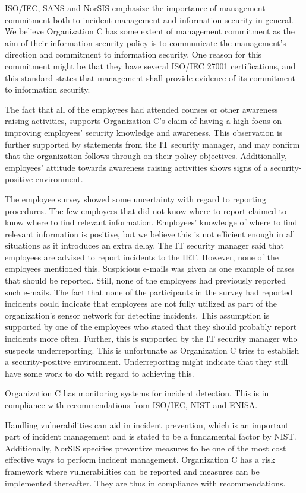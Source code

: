 ISO/IEC, SANS and NorSIS emphasize the importance of management commitment both to incident management and information security in general. We believe Organization C has some extent of management commitment as the aim of their information security policy is to communicate the management's direction and commitment to information security. One reason for this commitment might be that they have several ISO/IEC 27001 certifications, and this standard states that management shall provide evidence of its commitment to information security. 

The fact that all of the employees had attended courses or other awareness raising activities, supports Organization C's claim of having a high focus on improving employees' security knowledge and awareness. This observation is further supported by statements from the IT security manager, and may confirm that the organization follows through on their policy objectives. Additionally, employees' attitude towards awareness raising activities shows signs of a security-positive environment.  
 
The employee survey showed some uncertainty with regard to reporting procedures. The few employees that did not know where to report claimed to know where to find relevant information. Employees' knowledge of where to find relevant information is positive, but we believe this is not efficient enough in all situations as it introduces an extra delay. The IT security manager said that employees are advised to report incidents to the \ac{IRT}. However, none of the employees mentioned this. Suspicious e-mails was given as one example of cases that should be reported. Still, none of the employees had previously reported such e-mails. The fact that none of the participants in the survey had reported incidents could indicate that employees are not fully utilized as part of the organization's sensor network for detecting incidents. This assumption is supported by one of the employees who stated that they should probably report incidents more often. Further, this is supported by the IT security manager who suspects underreporting. This is unfortunate as Organization C tries to establish a security-positive environment. Underreporting might indicate that they still have some work to do with regard to achieving this. 

Organization C has monitoring systems for incident detection. This is in compliance with recommendations from ISO/IEC, NIST and ENISA. 

Handling vulnerabilities can aid in incident prevention, which is an important part of incident management and is stated to be a fundamental factor by NIST. Additionally, NorSIS specifies preventive measures to be one of the most cost effective ways to perform incident management. Organization C has a risk framework where vulnerabilities can be reported and measures can be implemented thereafter. They are thus in compliance with recommendations.

